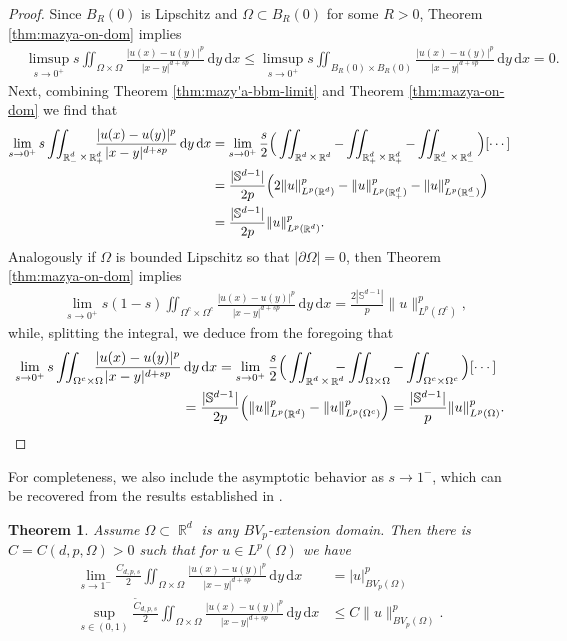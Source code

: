 \documentclass[12pt, reqno]{amsart}%
\theoremstyle{plain}  %
\newtheorem{theorem}{Theorem}[section]
\theoremstyle{definition}  %
\theoremstyle{remark}
\numberwithin{equation}{section}
\DeclareMathOperator{\R}{\mathbb{R}}
\renewcommand{\d}{\,\mathrm{d}}
\begin{document}
\begin{proof}
 Since $B_R(0)$ is Lipschitz and $\Omega\subset B_R(0)$ for some $R>0$, Theorem \ref{thm:mazya-on-dom} implies
\begin{align*}
&\limsup_{s\to 0^+}
s \iint_{\Omega \times \Omega}
\frac{|u(x) - u(y)|^p}{|x-y|^{d+sp}} \d y \d x\leq \limsup_{s\to 0^+}
s \iint_{B_R(0) \times B_R(0)}
\frac{|u(x) - u(y)|^p}{|x-y|^{d+sp}} \d y \d x=0.
\end{align*}
Next, combining Theorem \ref{thm:mazy'a-bbm-limit} and Theorem \ref{thm:mazya-on-dom} we find that
\begin{align*}
\lim_{s\to 0^+}
s\iint_{\R^d_- \times \R^d_+}
\hspace{-2ex}\frac{|u(x) - u(y)|^p}{|x-y|^{d+sp}} \d y \d x
&=\lim_{s\to 0^+}
\frac{s}{2}\Big(\iint_{\R^d \times \R^d}- \iint_{\R^d_+ \times \R^d_+}- \iint_{\R^d_- \times \R^d_-}\Big)[\cdots]\\
&=\frac{|\mathbb{S}^{d-1}|}{2p}\Big( 2\|u\|^p_{L^p(\R^d)}-
\|u\|^p_{L^p(\R^d_+)}-\|u\|^p_{L^p(\R^d_-)}\Big)\\
&=\frac{|\mathbb{S}^{d-1}|}{2p}\|u\|^p_{L^p(\R^d)}.
\end{align*}
Analogously if $\Omega$ is bounded Lipschitz so that $|\partial \Omega|=0$, then Theorem \ref{thm:mazya-on-dom} implies
\begin{align*}
&\lim_{s\to 0^+}
s(1-s) \iint_{\Omega^c \times \Omega^c}
\frac{|u(x) - u(y)|^p}{|x-y|^{d+sp}} \d y \d x=
\frac{2|\mathbb{S}^{d-1}|}{p}\|u\|^p_{L^p(\Omega^c)},
\end{align*}
while, splitting the integral, we deduce from the foregoing  that
\begin{align*}
\lim_{s\to 0^+}
s\iint_{\Omega^c \times \Omega}
\hspace{-2ex} \frac{|u(x) - u(y)|^p}{|x-y|^{d+sp}} &\d y \d x
= \lim_{s\to 0^+}
\frac{s}{2}\Big(\iint_{\R^d \times \R^d} \hspace{-2ex}- \iint_{\Omega \times \Omega}- \iint_{\Omega^c \times \Omega^c}\Big)[\cdots]\\
&=\frac{|\mathbb{S}^{d-1}|}{2p}
\Big( \|u\|^p_{L^p(\R^d)}-\|u\|^p_{L^p(\Omega^c)}\Big)=\frac{|\mathbb{S}^{d-1}|}{p}\|u\|^p_{L^p(\Omega)}.
\end{align*}
\end{proof}
For completeness, we also include the asymptotic behavior as $s \to 1^-$, which can be recovered from the results established in \cite{BBM01,Dav02,Fog23,Fog25}.
\begin{theorem}\label{thm:xBBM-frac}
Assume  $\Omega\subset \R^d$ is any $BV_p$-extension domain. Then there is $C= C(d,p,\Omega)>0$ such that for $u\in L^p(\Omega)$ we have
\begin{align*}
\lim_{s\to 1^-}\frac{C_{d,p,s}}{2}\iint_{ \Omega \times \Omega}\frac{|u(x) - u(y)|^p}{|x-y|^{d+sp}} \d y \d x&= |u|^p_{BV_p(\Omega)}\\
\sup_{s\in (0,1)} \frac{\widetilde{C}_{d,p,s}}{2}\iint_{ \Omega \times \Omega}\frac{|u(x) - u(y)|^p}{|x-y|^{d+sp}} \d y \d x &\leq C \|u\|^p_{BV_p(\Omega)}.
\end{align*}
\end{theorem}
\end{document}
